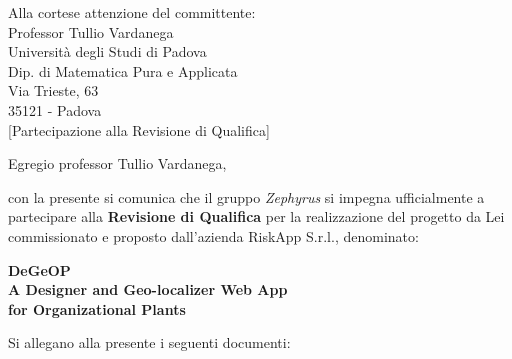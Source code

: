 \documentclass[a4paper,12pt]{letteracdp}
\author{Daniel De Gaspari}
\date{10 Aprile 2017}
\begin{document}
	\begin{letter}{
			Alla cortese attenzione del committente: \\
			Professor Tullio Vardanega \\
			Università degli Studi di Padova \\
			Dip. di Matematica Pura e Applicata\\
			Via Trieste, 63 \\
			35121 - Padova\\}
		[Partecipazione alla Revisione di Qualifica]

	\opening{Egregio professor Tullio Vardanega,}
	con la presente si comunica che il gruppo \textit{Zephyrus} si impegna ufficialmente a partecipare alla \textbf{Revisione di Qualifica} per la realizzazione del progetto da Lei commissionato e proposto dall'azienda RiskApp S.r.l., denominato:

	\begin{center}
        \textbf{DeGeOP \\ A Designer and Geo-localizer Web App \\for Organizational Plants}\\
	\end{center}
	\vspace{0.6cm}

	\noindent Si allegano alla presente
	 i seguenti documenti:



\end{letter}
\end{document}
